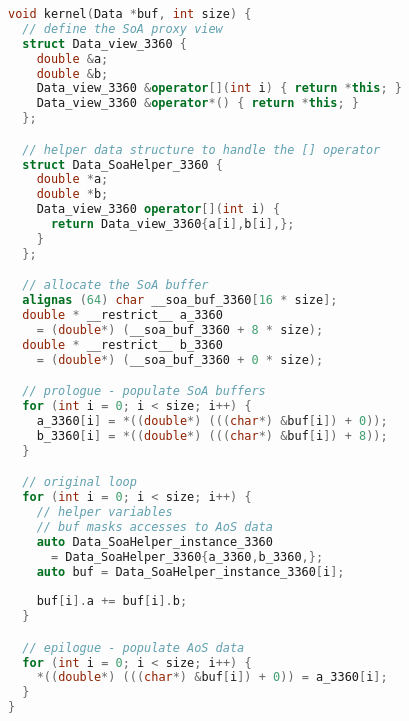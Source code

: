 \algrenewcommand\algorithmicindent{0.4em}%

\begin{lstlisting}[language=C++,
                   label=algorithm:rewrite-demo:rewritten,
                   caption=Transformed loop from Listing~\ref{algorithm:rewrite-demo:vanilla},
                   basicstyle=\footnotesize]
void kernel(Data *buf, int size) {
  // define the SoA proxy view 
  struct Data_view_3360 {
    double &a;
    double &b;
    Data_view_3360 &operator[](int i) { return *this; }
    Data_view_3360 &operator*() { return *this; }
  };

  // helper data structure to handle the [] operator
  struct Data_SoaHelper_3360 {
    double *a;
    double *b;
    Data_view_3360 operator[](int i) {
      return Data_view_3360{a[i],b[i],};
    }
  };

  // allocate the SoA buffer
  alignas (64) char __soa_buf_3360[16 * size];
  double * __restrict__ a_3360 
    = (double*) (__soa_buf_3360 + 8 * size);
  double * __restrict__ b_3360 
    = (double*) (__soa_buf_3360 + 0 * size);

  // prologue - populate SoA buffers
  for (int i = 0; i < size; i++) {
    a_3360[i] = *((double*) (((char*) &buf[i]) + 0));
    b_3360[i] = *((double*) (((char*) &buf[i]) + 8));
  }

  // original loop
  for (int i = 0; i < size; i++) {
    // helper variables
    // buf masks accesses to AoS data
    auto Data_SoaHelper_instance_3360
      = Data_SoaHelper_3360{a_3360,b_3360,};
    auto buf = Data_SoaHelper_instance_3360[i];
  
    buf[i].a += buf[i].b;
  }

  // epilogue - populate AoS data
  for (int i = 0; i < size; i++) {
    *((double*) (((char*) &buf[i]) + 0)) = a_3360[i];
  }
}
\end{lstlisting}
